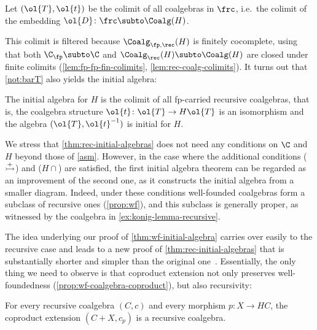 \documentclass[a4paper,UKenglish, autoref, numberwithinsect, final]{lipics-v2021}
\numberwithin{equation}{section}
\newcommand{\injmono}{\ensuremath{\overset{\smash{\raisebox{-1pt}{\ensuremath{\scriptstyle+}}}}{\rightarrowtail}}}%
\newcommand{\hpresint}{\ensuremath{H\cap}\xspace}
\theoremstyle{plain}
\theoremstyle{definition}
\begin{document}
\begin{construction}\label{not:barT}
Let $(\ol{T},\ol{t})$ be the colimit of all coalgebras in $\frc$, i.e.\ the colimit of the embedding $\ol{D}\colon \frc\subto \Coalg(H)$. 
\end{construction}
This colimit is filtered because $\Coalg_{\fp,\rec}(H)$ is finitely cocomplete, using that both $\C_\fp\subto \C$ and $\Coalg_\rec(H)\subto \Coalg(H)$ are closed under finite colimits (\autoref{lem:fp-fp-fin-colimits}, \autoref{lem:rec-coalg-colimits}). It turns out that \autoref{not:barT} also yields the initial algebra:

\begin{theorem}\label{thm:rec-initial-algebras}
The initial algebra for $H$ is the colimit of all fp-carried recursive coalgebras, that is, the coalgebra structure $\ol{t}\colon \ol{T}\to H\ol{T}$ is an isomorphism and the algebra $(\ol{T},\ol{t}^{-1})$ is initial for $H$.
\end{theorem}
We stress that \autoref{thm:rec-initial-algebras} does not need any conditions on $\C$ and $H$ beyond those of \autoref{asm}. However, in the case where the additional conditions (\injmono) and (\hpresint) are satisfied, the first initial algebra theorem can be regarded as an improvement of the second one, as it constructs the initial algebra from a smaller diagram. Indeed, under these conditions well-founded coalgebras form a subclass of recursive ones (\autoref{prop:wf}), and this subclass is generally proper, as witnessed by the coalgebra in \autoref{ex:konig-lemma-recursive}.

The idea underlying our proof of \autoref{thm:wf-initial-algebra} carries over easily to the recursive case and leads to a new proof of \autoref{thm:rec-initial-algebras} that is substantially shorter and simpler than the original one~\cite{wm24}. Essentially, the only thing we need to observe is that coproduct extension not only preserves well-foundedness (\autoref{prop:wf-coalgebra-coproduct}), but also recursivity:

\begin{proposition}\label{prop:rec-coalgebra-coproduct}
For every recursive coalgebra $(C,c)$ and every morphism $p\colon X\to HC$, the coproduct extension $(C+X,c_p)$ is a recursive coalgebra.
\end{proposition}
\end{document}
